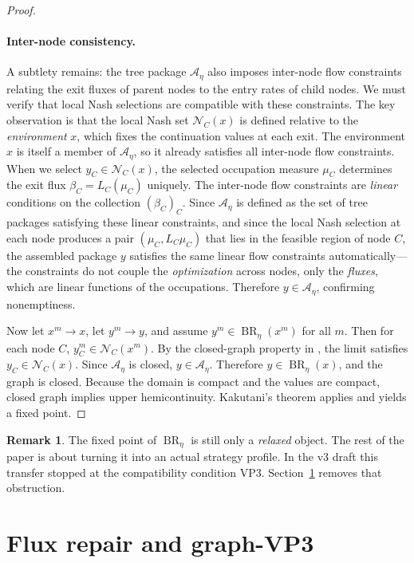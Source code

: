 \documentclass[12pt]{article}
\theoremstyle{definition}
\newtheorem{remark}[theorem]{Remark}
\newcommand{\1}{\mathbf{1}}
\newcommand{\cA}{\mathcal{A}}
\newcommand{\cN}{\mathcal{N}}
\begin{document}
\begin{proof}
\paragraph{Inter-node consistency.}
A subtlety remains: the tree package \(\cA_\eta\) also imposes inter-node flow constraints relating the exit fluxes of parent nodes to the entry rates of child nodes. We must verify that local Nash selections are compatible with these constraints. The key observation is that the local Nash set \(\cN_C(x)\) is defined relative to the \emph{environment} \(x\), which fixes the continuation values at each exit. The environment \(x\) is itself a member of \(\cA_\eta\), so it already satisfies all inter-node flow constraints. When we select \(y_C\in \cN_C(x)\), the selected occupation measure \(\mu_C\) determines the exit flux \(\beta_C=L_C(\mu_C)\) uniquely. The inter-node flow constraints are \emph{linear} conditions on the collection \((\beta_C)_C\). Since \(\cA_\eta\) is defined as the set of tree packages satisfying these linear constraints, and since the local Nash selection at each node produces a pair \((\mu_C,L_C\mu_C)\) that lies in the feasible region of node \(C\), the assembled package \(y\) satisfies the same linear flow constraints automatically---the constraints do not couple the \emph{optimization} across nodes, only the \emph{fluxes}, which are linear functions of the occupations. Therefore \(y\in \cA_\eta\), confirming nonemptiness.

Now let \(x^m\to x\), let \(y^m\to y\), and assume \(y^m\in \operatorname{BR}_\eta(x^m)\)
for all \(m\).  Then for each node \(C\), \(y_C^m\in \cN_C(x^m)\).  By the closed-graph
property in , the limit satisfies \(y_C\in \cN_C(x)\).  Since
\(\cA_\eta\) is closed, \(y\in \cA_\eta\).  Therefore \(y\in \operatorname{BR}_\eta(x)\),
and the graph is closed.  Because the domain is compact and the values are compact,
closed graph implies upper hemicontinuity.  Kakutani's theorem applies and yields a fixed
point.
\end{proof}

\begin{remark}
The fixed point of \(\operatorname{BR}_\eta\) is still only a \emph{relaxed} object.  The
rest of the paper is about turning it into an actual strategy profile.  In the v3 draft
this transfer stopped at the compatibility condition VP3.  Section~\ref{sec:flux} removes
that obstruction.
\end{remark}

\section{Flux repair and graph-VP3}
\label{sec:flux}
\end{document}
